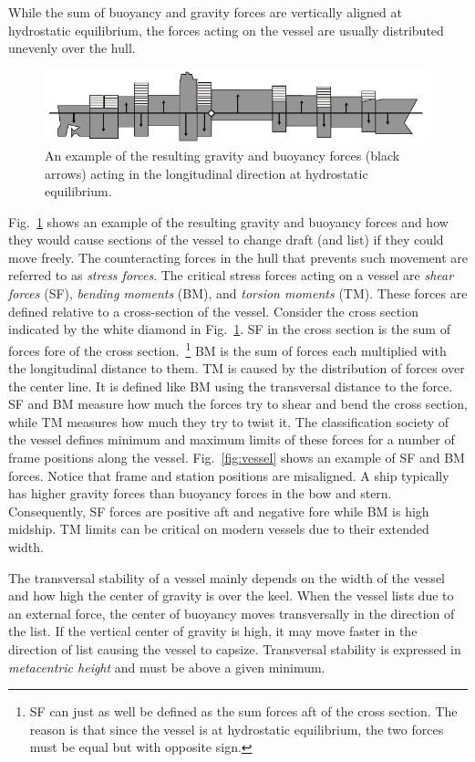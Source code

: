 \documentclass[runningheads]{llncs}
\begin{document}
While the sum of buoyancy and gravity forces are vertically aligned at hydrostatic equilibrium, the forces acting on the vessel are usually distributed unevenly over the hull.
\begin{figure}[h!]
	\centering
		\includegraphics[scale=1]{figures/3_12.pdf}
	\caption{An example of the resulting gravity and buoyancy forces (black arrows) acting in the longitudinal direction at hydrostatic equilibrium.}
	\label{fig:forces}
\end{figure}
Fig.~\ref{fig:forces} shows an example of the resulting gravity and buoyancy forces and how they would cause sections of the vessel to change draft (and list) if they could move freely. The counteracting forces in the hull that prevents such movement are referred to as {\em stress forces}. The critical stress forces acting on a vessel are {\em shear forces} (SF), {\em bending moments} (BM), and {\em torsion moments} (TM). These forces are defined relative to a cross-section of the vessel. Consider the cross section indicated by the white diamond in Fig.~\ref{fig:forces}. SF in the cross section is the sum of forces fore of the cross section.~\footnote{SF can just as well be defined as the sum forces aft of the cross section. The reason is that since the vessel is at hydrostatic equilibrium, the two forces must be equal but with opposite sign.} BM is the sum of forces each multiplied with the longitudinal distance to them. TM is caused by the distribution of forces over the center line. It is defined like BM using the transversal distance to the force. SF and BM measure how much the forces try to shear and bend the cross section, while TM measures how much they try to twist it. The classification society of the vessel defines minimum and maximum limits of these forces for a number of frame positions along the vessel. Fig.~\ref{fig:vessel} shows an example of SF and BM forces. Notice that frame and station positions are misaligned. A ship typically has higher gravity forces than buoyancy forces in the bow and stern. Consequently, SF forces are positive aft and negative fore while BM is high midship. TM  limits can be critical on modern vessels due to their extended width.

The transversal stability of a vessel mainly depends on the width of the vessel and how high the center of gravity is over the keel.  When the vessel lists due to an external force, the center of buoyancy moves transversally in the direction of the list. If the vertical center of gravity is high, it may move faster in the direction of list causing the vessel to capsize. Transversal stability is expressed in {\em metacentric height} and must be above a given minimum.  
\end{document}
